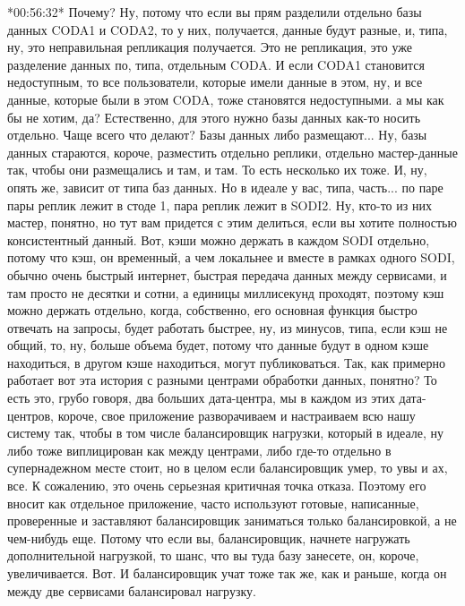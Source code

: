 \documentclass[12pt]{article} %
\begin{document}
*00:56:32*
Почему? Ну, потому что если вы прям разделили отдельно базы данных CODA1 и CODA2,  то у них, получается, данные будут разные, и, типа, ну, это неправильная репликация получается.  Это не репликация, это уже разделение данных по, типа, отдельным CODA.  И если CODA1 становится недоступным, то все пользователи, которые имели данные в этом, ну, и все данные, которые были в этом CODA, тоже становятся недоступными.  а мы как бы не хотим, да?  Естественно, для этого нужно базы данных как-то носить отдельно.  Чаще всего что делают?  Базы данных либо размещают...  Ну, базы данных стараются, короче, разместить отдельно реплики, отдельно мастер-данные так, чтобы они размещались и там, и там.  То есть несколько их тоже.  И, ну, опять же, зависит от типа баз данных.  Но в идеале у вас, типа, часть...  по паре пары реплик лежит в стоде 1, пара реплик лежит в SODI2. Ну, кто-то из них мастер, понятно, но тут вам придется с этим делиться, если вы хотите полностью консистентный данный.  Вот, кэши можно держать в каждом SODI отдельно, потому что кэш, он временный, а чем локальнее и вместе в рамках одного SODI, обычно очень быстрый интернет, быстрая передача данных между сервисами, и там просто не десятки и сотни, а единицы миллисекунд проходят, поэтому кэш можно держать отдельно, когда, собственно, его основная функция быстро отвечать на запросы, будет работать быстрее, ну, из минусов, типа, если кэш не общий, то, ну, больше объема будет, потому что данные будут в одном кэше находиться, в другом кэше находиться, могут публиковаться.  Так, как примерно работает вот эта история с разными центрами обработки данных, понятно?  То есть это, грубо говоря, два больших дата-центра, мы в каждом из этих дата-центров, короче, свое приложение разворачиваем и настраиваем всю нашу систему так, чтобы в том числе балансировщик нагрузки, который в идеале, ну либо тоже виплицирован как между центрами, либо где-то отдельно в супернадежном месте стоит, но в целом если балансировщик умер, то увы и ах, все. К сожалению, это очень серьезная критичная точка отказа. Поэтому его вносит как отдельное приложение, часто используют готовые, написанные, проверенные и заставляют балансировщик заниматься только балансировкой, а не чем-нибудь еще.  Потому что если вы, балансировщик, начнете нагружать дополнительной нагрузкой, то шанс, что вы туда базу занесете, он, короче, увеличивается.  Вот. И балансировщик учат тоже так же, как и раньше, когда он между две сервисами балансировал нагрузку.
\end{document}
